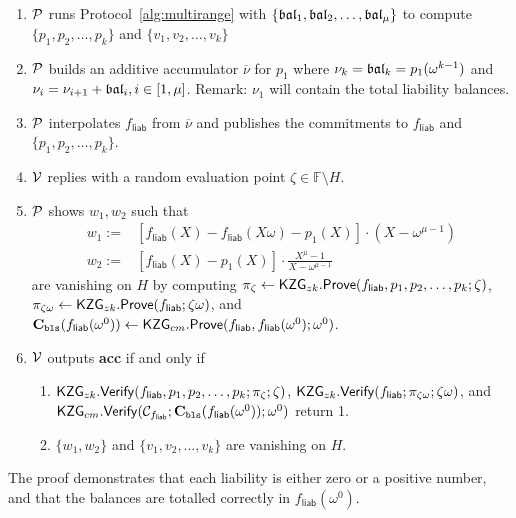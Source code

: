 

\begin{Protocol*}[t!]
\begin{mdframed}
\footnotesize


\begin{enumerate}
    \item $\mathcal{P}$ runs Protocol~\ref{alg:multirange} with $\{\mathfrak{bal}_1,\mathfrak{bal}_2,\dots,\mathfrak{bal}_\mu\}$ to compute $\{p_1,p_2,\dots,p_k\}$ and $\{v_1,v_2,\dots,v_k\}$
    \item $\mathcal{P}$ builds an additive accumulator $\overline{\nu}$ for $p_1$ where $\nu_k=\mathfrak{bal}_k=p_1(\omega^{k-1})$ and $\nu_i=\nu_{i+1}+\mathfrak{bal}_i,i\in[1,\mu]$. Remark: $\nu_1$ will contain the total liability balances.
    \item $\mathcal{P}$ interpolates $f_\mathsf{liab}$ from $\overline{\nu}$ and publishes the commitments to $f_\mathsf{liab}$ and $\{p_1,p_2,\dots,p_k\}$.
    \item $\mathcal{V}$ replies with a random evaluation point $\zeta\in\mathbb{F}\setminus{H}$.
    \item $\mathcal{P}$ shows $w_1,w_2$ such that
    \begin{align*}
        w_1:=&[f_\mathsf{liab}(X)-f_\mathsf{liab}(X\omega)-p_1(X)]\cdot(X-\omega^{\mu-1}) \\
        w_2:=&[f_\mathsf{liab}(X)-p_1(X)]\cdot\frac{X^\mu-1}{X-\omega^{\mu-1}}
    \end{align*}
    are vanishing on $H$ by computing $\pi_\zeta\leftarrow\mathsf{KZG}_{zk}.\mathsf{Prove}(f_\mathsf{liab},p_1,p_2,\dots,p_k;\zeta)$, $\pi_{\zeta\omega}\leftarrow\mathsf{KZG}_{zk}.\mathsf{Prove}(f_\mathsf{liab};\zeta\omega)$, and $\textbf{C}_\texttt{bls}(f_\mathsf{liab}(\omega^0))\leftarrow\mathsf{KZG}_{cm}.\mathsf{Prove}(f_\mathsf{liab},f_\mathsf{liab}(\omega^0);\omega^0)$.
    \item $\mathcal{V}$ outputs \textbf{acc} if and only if
    \begin{enumerate}
        \item $\mathsf{KZG}_{zk}.\mathsf{Verify}(f_\mathsf{liab},p_1,p_2,\dots,p_k;\pi_\zeta;\zeta)$, $\mathsf{KZG}_{zk}.\mathsf{Verify}(f_\mathsf{liab};\pi_{\zeta\omega};\zeta\omega)$, and $\mathsf{KZG}_{cm}.\mathsf{Verify}(\mathcal{C}_{f_\mathsf{liab}};\textbf{C}_\texttt{bls}(f_\mathsf{liab}(\omega^0));\omega^0)$ return 1.
        \item $\{w_1,w_2\}$ and $\{v_1,v_2,\dots,v_k\}$ are vanishing on $H$.
    \end{enumerate}
\end{enumerate}


\normalsize	
\end{mdframed}
\caption{The \pol proof demonstrates that each liability is either zero or a positive number, and that the balances are totalled correctly in $f_\mathsf{liab}(\omega^0)$. \label{alg:pol}}
\end{Protocol*}
